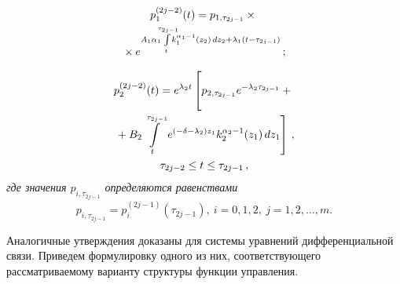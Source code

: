 \begin{multicols}{2}
\vspace*{-12pt}

\noindent
\begin{multline*}
p^{(2j-2)}_1(t)= p_{1,\tau_{2j-1}}\times{}\\
{}\times e^{ A_1\alpha_1 \hspace*{-2mm}
\int\limits^{ \tau_{2j-1}}_t\hspace*{-2.5mm} k^{\alpha_1-1}_1(z_2) \,dz_2 + 
\lambda_1 (t-\tau_{2j-1})}\,;
\end{multline*}

\vspace*{-12pt}

\noindent
\begin{multline*}
p^{(2j-2)}_2(t)=e^{\lambda_2t} \left[ 
\vphantom{\int\limits^{\tau_{2j-1}}_t}
p_{2,\tau_{2j-1}} 
e^{-\lambda_2 \tau_{2j-1}}+{}\right.\\
\left.{}+B_2
 \int\limits^{\tau_{2j-1}}_t 
e^{(-\delta -\lambda_2)z_1}k^{\alpha_2-1}_2(z_1) \,dz_1 \right]\,,\\
\tau_{2j-2} \leq t \leq \tau_{2j-1}\,,
\end{multline*}
\textit{где значения $p_{i,\tau_{2j-1}}$ определяются равенствами}
$$
p_{i,\tau_{2j-1}}=p_i^{(2j-1)}(\tau_{2j-1}),\ i=0,1,2,\ j=1,2,\ldots,m.
$$

Аналогичные утверждения доказаны для системы уравнений дифференциальной связи. 
Приведем формулировку одного из них, соответствующего рассматриваемому варианту 
структуры функции управления.

\smallskip


\end{multicols}
